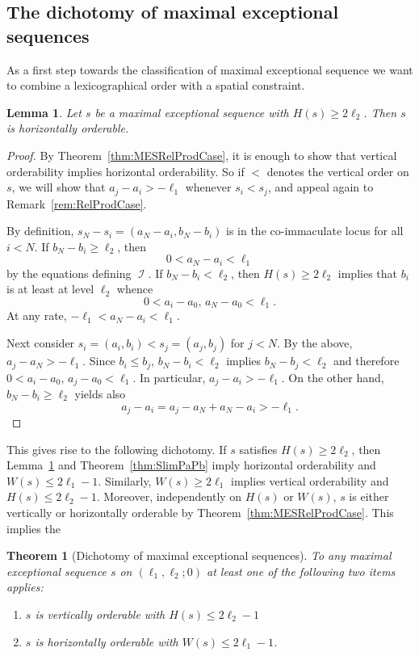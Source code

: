 \documentclass[11pt]{article}
\newtheorem{theorem}[theo]{Theorem}
\newtheorem{lemma}[theo]{Lemma}
\theoremstyle{definition}
\numberwithin{equation}{section}
\newcommand{\CI}{{\mathcal I}}
\newcommand{\nImm}{\operatorname{\CI}}
\newcommand{\cl}{s}
\newcommand{\mes}{maximal exceptional sequence}
\begin{document}
\subsection{The dichotomy of {\mes}s}
\label{subsec:DichoMESPC}
As a first step towards the classification
of {\mes} we want to combine a lexicographical
order with a spatial constraint.

\begin{lemma}
\label{prop:HorVer}
Let $\cl$ be a {\mes} with $H(\cl)\geq2\ell_2$.
Then $\cl$ is horizontally orderable.
\end{lemma}

\begin{proof}
{By Theorem~\ref{thm:MESRelProdCase}, it is enough
to show that vertical orderability
implies horizontal orderability. So if
$<$ denotes the vertical order
on $\cl$, we will show that $a_j-a_i>-\ell_1$ 
whenever $\cl_i<\cl_j$, and appeal again to 
Remark~\ref{rem:RelProdCase}.}

By definition, 
$\cl_N-\cl_i=(a_N-a_i,b_N-b_i)$
is in the {co-immaculate} locus for all $i<N$. 
If $b_N-b_i\geq\ell_2$, then  
$$
0<a_N-a_i<\ell_1
$$
by the equations defining $\nImm$. 
If $b_N-b_i<\ell_2$, then 
$H(\cl)\geq2\ell_2$ implies that $b_i$ is 
at least at level $\ell_2$ whence 
$$
0<a_i-a_0,\,a_N-a_0<\ell_1.
$$
At any rate, $-\ell_1<a_N-a_i<\ell_1$.

Next consider $\cl_i=(a_i,b_i)<
\cl_j=(a_j,b_j)$ for $j<N$. By the above,
$a_j-a_N>-\ell_1$. Since $b_i\leq b_j$,
$b_N-b_i<\ell_2$ implies $b_N-b_j<\ell_2$
and therefore $0<a_i-a_0,\,a_j-a_0<\ell_1$. 
In particular, $a_j-a_i>-\ell_1$. On the
other hand, $b_N-b_i\geq\ell_2$ yields
also
$$
a_j-a_i=a_j-a_N+a_N-a_i>-\ell_1.
$$
\end{proof}

This gives rise to the following dichotomy. 
If $\cl$ satisfies
$H(\cl)\geq2\ell_2$, then Lemma~\ref{prop:HorVer} 
and Theorem~\ref{thm:SlimPaPb} imply 
horizontal orderability and $W(\cl)\leq
2\ell_1-1$. Similarly, 
$W(\cl)\geq2\ell_1$ implies 
vertical orderability and $H(\cl)\leq2\ell_2-1$.
Moreover, independently on $H(\cl)$ or $W(\cl)$,
$\cl$ is either vertically 
or horizontally orderable by 
Theorem~\ref{thm:MESRelProdCase}. This 
implies the

\begin{theorem}[Dichotomy of \mes s]
\label{thm:Dichotomy}
To any {\mes} $\cl$ on $(\ell_1,\ell_2;0)$
at least one of the following two items applies:
\begin{enumerate}
\item[(i)] $\cl$ is vertically orderable with 
$H(\cl)\leq2\ell_2-1$
\vspace{1ex}
\item[(ii)] $\cl$ is horizontally orderable 
with $W(\cl)\leq2\ell_1-1$.
\end{enumerate}
\end{theorem}
\end{document}
